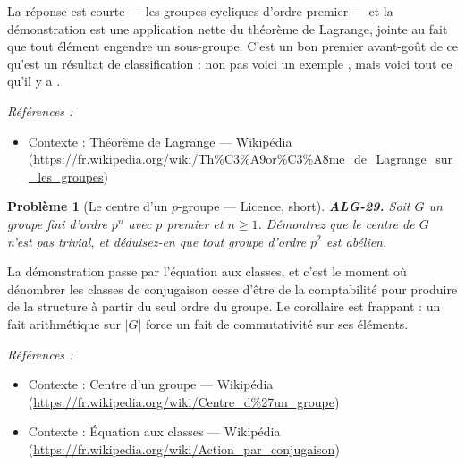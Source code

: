 \documentclass[11pt]{article}
\newtheorem{problem}{Problème}
\newenvironment{refs}{\par\small\noindent\emph{Références :}\begin{itemize}\setlength\itemsep{0pt}}{\end{itemize}\normalsize}
\begin{document}
\noindent La réponse est courte --- les groupes cycliques d'ordre premier --- et la démonstration est une application nette du théorème de Lagrange, jointe au fait que tout élément engendre un sous-groupe. C'est un bon premier avant-goût de ce qu'est un résultat de classification : non pas \og{} voici un exemple \fg{}, mais \og{} voici tout ce qu'il y a \fg{}.

\begin{refs}
\item Contexte : Théorème de Lagrange --- Wikipédia (\url{https://fr.wikipedia.org/wiki/Th%C3%A9or%C3%A8me_de_Lagrange_sur_les_groupes})
\end{refs}

\bigskip

\begin{problem}[{Le centre d'un $ p $-groupe --- Licence, short}]
\textbf{ALG-29.} Soit $ G $ un groupe fini d'ordre $ p^n $ avec $ p $ premier et $ n \geq 1 $. Démontrez que le centre de $ G $ n'est pas trivial, et déduisez-en que tout groupe d'ordre $ p^2 $ est abélien.
\end{problem}

\noindent La démonstration passe par l'équation aux classes, et c'est le moment où dénombrer les classes de conjugaison cesse d'être de la comptabilité pour produire de la structure à partir du seul ordre du groupe. Le corollaire est frappant : un fait arithmétique sur $ |G| $ force un fait de commutativité sur ses éléments.

\begin{refs}
\item Contexte : Centre d'un groupe --- Wikipédia (\url{https://fr.wikipedia.org/wiki/Centre_d%27un_groupe})
\item Contexte : Équation aux classes --- Wikipédia (\url{https://fr.wikipedia.org/wiki/Action_par_conjugaison})
\end{refs}

\bigskip
\end{document}
